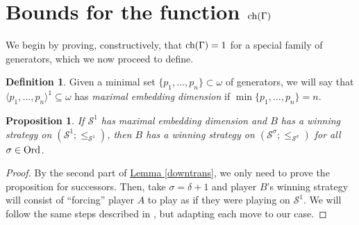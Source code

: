 \documentclass[reqno]{amsart}
\newtheorem{proposition}[theorem]{Proposition}
\theoremstyle{definition}
\theoremstyle{definition}
\newtheorem{definition}[theorem]{Definition}
\theoremstyle{plain} %
\begin{document}
\section{Bounds for the function $\textnormal{ch}(\Gamma)$}
We begin by proving, constructively, that $\textnormal{ch}(\Gamma)=1$ for a special family of generators, which we now proceed to define.
\begin{definition}
    Given a minimal set $\{p_1,\dots,p_n\}\subset\omega$ of generators, we will say that $\langle p_1,\dots,p_n\rangle^1\subseteq\omega$ has \textit{maximal embedding dimension} if $\min\{p_1,\dots,p_n\}=n$.
\end{definition}
\begin{proposition}\label{propmaxemd}
    If $\mathcal{S}^1 $ has maximal embedding dimension and $B$ has a winning strategy on $(\mathcal{S}^1;\leq_{\mathcal{S}^1})$, then $B$ has a winning strategy on $(\mathcal{S}^\sigma;\leq_{\mathcal{S}^\sigma})$ for all $\sigma\in\textnormal{Ord}$.
\end{proposition}\begin{proof}
    By the second part of \hyperref[downtrans]{Lemma \ref{downtrans}}, we only need to prove the proposition for successors. Then, take $\sigma=\delta+1$ and player $B$'s winning strategy will consist of ``forcing'' player $A$ to play as if they were playing on $\mathcal{S}^1$. We will follow the same steps described in \cite[Theorem 3.4]{ALCO_2018__1_3_371_0}, but adapting each move to our case.


\end{proof}
\end{document}
